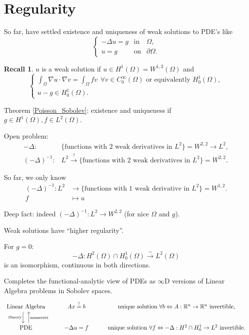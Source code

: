 \documentclass[12pt]{article}
\theoremstyle{definition}
\newtheorem*{recall}{Recall}
\begin{document}
\section{Regularity}
So far, have settled existence and uniqueness of weak solutions to PDE's like
\[\left\{\begin{array}{rcl}-\Delta u=g&\text{in}&\Omega,\\u=g&\text{on}&\partial\Omega.\end{array}\right.\]
\begin{recall}
$u$ is a weak solution if $u\in H^1(\Omega)=W^{1,2}(\Omega)$ and
\[\left\{\begin{array}{l}\displaystyle{\int_{\Omega}\nabla u\cdot\nabla v=\int_{\Omega}fv\ \ \forall v\in C_0^{\infty}(\Omega)\text{ or equivalently }H_0^1(\Omega),}\\u-g\in H_0^1(\Omega).\end{array}\right.\]

Theorem \ref{Poisson_Sobolev}: existence and uniqueness if $g\in H^1(\Omega),f\in L^2(\Omega)$.
\end{recall}

Open problem:
\begin{align*}
-\Delta:&\{\text{functions with 2 weak derivatives in }L^2\}=W^{2,2}\longrightarrow L^2,\\
(-\Delta)^{-1}:&L^2\overset{?}{\longrightarrow}\{\text{functions with 2 weak derivatives in }L^2\}=W^{2,2}.
\end{align*}

So far, we only know
\begin{align*}
(-\Delta)^{-1}:L^2&\longrightarrow\{\text{functions with 1 weak derivative in }L^2\}=W^{1,2}.\\
f&\longmapsto u
\end{align*}

Deep fact: indeed $(-\Delta)^{-1}:L^2\rightarrow W^{2,2}$ (for nice $\Omega$ and $g$).

Weak solutions have ``higher regularity''.

For $g=0$:
\[-\Delta:H^2(\Omega)\cap H_0^1(\Omega)\overset{\sim}{\longrightarrow}L^2(\Omega)\]
is an isomorphism, continuous in both directions.

Completes the functional-analytic view of PDEs as $\infty$D versions of Linear Algebra problems in Sobolev spaces.
\[\begin{tikzcd}\text{Linear Algebra}\arrow[d,shift right,shift right,"\text{theory}",swap]&Ax\overset{!}{=}b&\text{unique solution }\forall b\Leftrightarrow A:\mathbb{R}^n\rightarrow\mathbb{R}^n\text{ invertible},\\\text{PDE}\arrow[u,shift right, shift right,"\text{numerics}",swap]&-\Delta u=f&\text{unique solution }\forall f\Leftrightarrow-\Delta:H^2\cap H_0^1\rightarrow L^2\text{ invertible}.\end{tikzcd}\]
\end{document}
